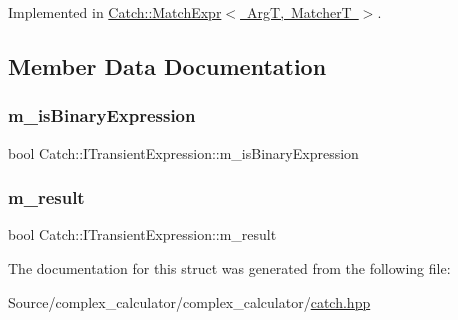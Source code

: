 Implemented in \mbox{\hyperlink{class_catch_1_1_match_expr_ad3e41adb597750b2219bb37e51185629}{Catch\+::\+Match\+Expr$<$ Arg\+T, Matcher\+T $>$}}.



\subsection{Member Data Documentation}
\mbox{\label{struct_catch_1_1_i_transient_expression_a75ce48da824d514d08152d396abb28d8}} 
\subsubsection{\texorpdfstring{m\+\_\+is\+Binary\+Expression}{m\_isBinaryExpression}}
{\footnotesize\ttfamily bool Catch\+::\+I\+Transient\+Expression\+::m\+\_\+is\+Binary\+Expression}

\mbox{\label{struct_catch_1_1_i_transient_expression_a4646e2b5e0156e913653ec3b9b60c942}} 
\subsubsection{\texorpdfstring{m\+\_\+result}{m\_result}}
{\footnotesize\ttfamily bool Catch\+::\+I\+Transient\+Expression\+::m\+\_\+result}



The documentation for this struct was generated from the following file\+:\begin{DoxyCompactItemize}
\item 
Source/complex\+\_\+calculator/complex\+\_\+calculator/\mbox{\hyperlink{catch_8hpp}{catch.\+hpp}}\end{DoxyCompactItemize}
